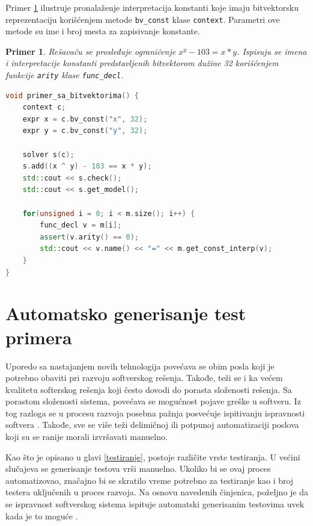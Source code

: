 \documentclass[12pt,oneside]{memoir}
\newtheorem{primer}{Primer}
\begin{document}
Primer \ref{ex6} ilustruje pronalaženje interpretacija konstanti koje imaju bitvektorsku reprezentaciju korišćenjem metode \texttt{bv\_const} klase \texttt{context}. Parametri ove metode su ime i broj mesta za zapisivanje konstante. 
\begin{primer} \label{ex6} 
Rešavaču se prosleđuje ograničenje $x^y - 103 = x*y$. 
Ispisuju se imena i interpretacije konstanti predstavljenih bitvektorom dužine 32 korišćenjem funkcije \texttt{arity} klase \texttt{func\_decl}.
\begin{lstlisting}[language=C++]
void primer_sa_bitvektorima() {
    context c;
    expr x = c.bv_const("x", 32);
    expr y = c.bv_const("y", 32);

    solver s(c);
    s.add((x ^ y) - 103 == x * y);
    std::cout << s.check();
    std::cout << s.get_model();
    
    for(unsigned i = 0; i < m.size(); i++) {
        func_decl v = m[i];
        assert(v.arity() == 0); 
        std::cout << v.name() << "=" << m.get_const_interp(v);
    }
}

\end{lstlisting}
\end{primer}



\chapter{Automatsko generisanje test primera} \label{implementacija}
Uporedo sa nastajanjem novih tehnologija povećava se obim posla koji je potrebno obaviti pri razvoju softverskog rešenja. Takođe, teži se i ka većem kvalitetu softerskog rešenja koji često dovodi do porasta složenosti rešenja. Sa porastom složenosti sistema, povećava se mogućnost pojave greške u softveru. Iz tog razloga se u procesu razvoja posebna pažnja posvećuje ispitivanju ispravnosti softvera \cite{Verification}. Takođe, sve se više teži delimičnoj ili potpunoj automatizaciji poslova koji su se ranije morali izvršavati manuelno. 
\par
Kao što je opisano u glavi \ref{testiranje}, postoje različite vrste testiranja. U većini slučajeva se generisanje testova vrši manuelno. Ukoliko bi se ovaj proces automatizovao, značajno bi se skratilo vreme potrebno za testiranje kao i broj testera uključenih u proces razvoja. 
Na osnovu navedenih činjenica, poželjno je da se ispravnost softverskog sistema ispituje automatski generisanim testovima uvek kada je to moguće \cite{AutomatedTestGeneration}.
\end{document}
